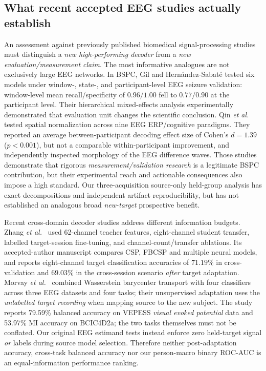 \subsection{What recent accepted EEG studies actually establish}
\label{sec:bspc-headtohead}
An assessment against previously published biomedical
signal-processing studies must distinguish a
\emph{new high-performing decoder} from a
\emph{new evaluation/measurement claim}.
The most informative analogues are not exclusively
large EEG networks. In BSPC, Gil and
Hern\'andez-Sabat\'e \cite{gil2026subjectvalidation}
tested six models under window-, state-, and
participant-level EEG seizure validation:
window-level mean recall/specificity of
$0.96/1.00$ fell to $0.77/0.90$ at the
participant level. Their hierarchical mixed-effects
analysis experimentally demonstrated that evaluation
unit changes the scientific conclusion.
Qin \emph{et al.}\ \cite{qin2026spatialnorm}
tested spatial normalization across nine EEG
ERP/cognitive paradigms. They reported an
average between-participant decoding effect
size of Cohen's $d=1.39$ ($p<0.001$), but
not a comparable within-participant improvement,
and independently inspected morphology of
the EEG difference waves.
Those studies demonstrate that rigorous
\emph{measurement/validation research} is a
legitimate BSPC contribution, but their
experimental reach and actionable consequences
also impose a high standard.
Our three-acquisition source-only
held-group analysis has exact decompositions
and independent artifact reproducibility,
but has not established an analogous broad
\emph{new-target} prospective benefit.

Recent cross-domain decoder studies address
different information budgets.
Zhang \emph{et al.}\
\cite{zhang2025crossdataset_gcn}
used 62-channel teacher features, eight-channel
student transfer, labelled target-session
fine-tuning, and channel-count/transfer ablations.
Its accepted-author manuscript compares CSP,
FBCSP and multiple neural models, and reports
eight-channel target classification accuracies
of $71.19\%$ in cross-validation and
$69.03\%$ in the cross-session scenario
\emph{after} target adaptation.
Morvay \emph{et al.}\
\cite{morvay2026wbt}
combined Wasserstein barycenter transport
with four classifiers across three
EEG datasets and four tasks; their
unsupervised adaptation uses the
\emph{unlabelled target recording} when
mapping source to the new subject.
The study reports 79.59\% balanced accuracy
on VEPESS \emph{visual evoked potential}
data and 53.97\% MI accuracy on
BCIC4D2a; the two tasks themselves
must not be conflated.
Our original EEG estimand tests instead
enforce zero held-target signal \emph{or}
labels during source model selection.
Therefore neither post-adaptation accuracy,
cross-task balanced accuracy nor our
person-macro binary ROC-AUC
is an equal-information performance ranking.

